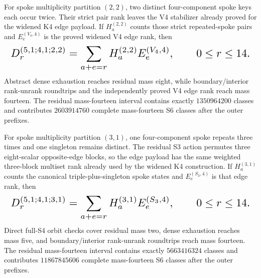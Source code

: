\documentclass{article}
\newcommand{\fitmath}[1]{\resizebox{0.99\linewidth}{!}{$\displaystyle #1$}}
\begin{document}
For spoke multiplicity partition $(2,2)$, two distinct four-component spoke
keys each occur twice. Their strict pair rank leaves the V4 stabilizer already
proved for the widened K4 edge payload. If $H_a^{(2,2)}$ counts those strict
repeated-spoke pairs and $E_e^{(V_4,4)}$ is the proved widened V4 edge rank,
then
\begin{equation}
  \fitmath{%
    D_r^{(5,1;4,1;2,2)}=
      \sum_{a+e=r}H_a^{(2,2)}E_e^{(V_4,4)},
    \qquad 0\leq r\leq14.
  }
  \label{eq:optimization-crazy-sextuple-s6-s5-s4-v4-spoke-ranking}
\end{equation}
Abstract dense exhaustion reaches residual mass eight, while boundary/interior
rank-unrank roundtrips and the independently proved V4 edge rank reach mass
fourteen. The residual mass-fourteen interval contains exactly $1350964200$
classes and contributes $2603914760$ complete mass-fourteen S6 classes after
the outer prefixes.

For spoke multiplicity partition $(3,1)$, one four-component spoke repeats three
times and one singleton remains distinct. The residual S3 action permutes three
eight-scalar opposite-edge blocks, so the edge payload has the same weighted
three-block multiset rank already used by the widened K4 construction. If
$H_a^{(3,1)}$ counts the canonical triple-plus-singleton spoke states and
$E_e^{(S_3,4)}$ is that edge rank, then
\begin{equation}
  \fitmath{%
    D_r^{(5,1;4,1;3,1)}=
      \sum_{a+e=r}H_a^{(3,1)}E_e^{(S_3,4)},
    \qquad 0\leq r\leq14.
  }
  \label{eq:optimization-crazy-sextuple-s6-s5-s4-s3-spoke-ranking}
\end{equation}
Direct full-S4 orbit checks cover residual mass two, dense exhaustion reaches
mass five, and boundary/interior rank-unrank roundtrips reach mass fourteen.
The residual mass-fourteen interval contains exactly $5663416324$ classes and
contributes $11867845606$ complete mass-fourteen S6 classes after the outer
prefixes.
\end{document}
